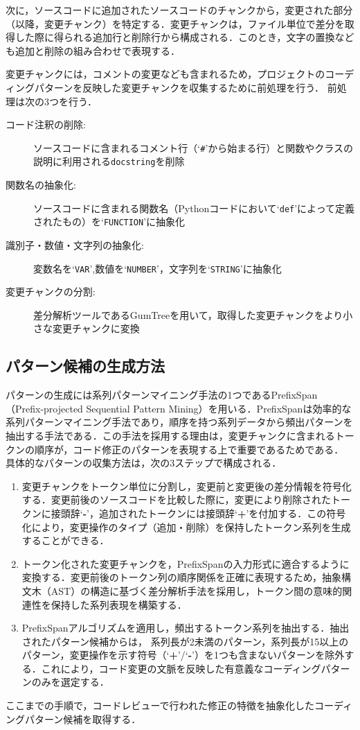 \documentclass[submit,techrep,noauthor]{ipsj}
\begin{document}
次に，ソースコードに追加されたソースコードのチャンクから，変更された部分（以降，変更チャンク）を特定する．変更チャンクは，ファイル単位で差分を取得した際に得られる追加行と削除行から構成される．このとき，文字の置換なども追加と削除の組み合わせで表現する．

変更チャンクには，コメントの変更なども含まれるため，プロジェクトのコーディングパターンを反映した変更チャンクを収集するために前処理を行う．
前処理は次の3つを行う．
\begin{description}
    \item[コード注釈の削除:]ソースコードに含まれるコメント行（`\texttt{\#}'から始まる行）と関数やクラスの説明に利用される\texttt{docstring}を削除
    \item[関数名の抽象化:]ソースコードに含まれる関数名（Pythonコードにおいて`\texttt{def}'によって定義されたもの）を`\texttt{FUNCTION}'に抽象化
    \item[識別子・数値・文字列の抽象化:]変数名を`\texttt{VAR}',数値を`\texttt{NUMBER}'，文字列を`\texttt{STRING}'に抽象化
    \item[変更チャンクの分割:]差分解析ツールであるGumTree\cite{gumtree}を用いて，取得した変更チャンクをより小さな変更チャンクに変換
\end{description}

\subsection{パターン候補の生成方法}
パターンの生成には系列パターンマイニング手法の1つであるPrefixSpan（Prefix-projected Sequential Pattern Mining）\cite{prefixspan}を用いる．PrefixSpanは効率的な系列パターンマイニング手法であり，順序を持つ系列データから頻出パターンを抽出する手法である．この手法を採用する理由は，変更チャンクに含まれるトークンの順序が，コード修正のパターンを表現する上で重要であるためである．
具体的なパターンの収集方法は，次の3ステップで構成される．
\begin{enumerate}
    \item 変更チャンクをトークン単位に分割し，変更前と変更後の差分情報を符号化する．変更前後のソースコードを比較した際に，変更により削除されたトークンに接頭辞`\textbf{-}'，追加されたトークンには接頭辞`\textbf{+}'を付加する．この符号化により，変更操作のタイプ（追加・削除）を保持したトークン系列を生成することができる．
    \item トークン化された変更チャンクを，PrefixSpanの入力形式に適合するように変換する．変更前後のトークン列の順序関係を正確に表現するため，抽象構文木（AST）の構造に基づく差分解析手法を採用し，トークン間の意味的関連性を保持した系列表現を構築する．
    \item PrefixSpanアルゴリズムを適用し，頻出するトークン系列を抽出する．抽出されたパターン候補からは， 系列長が2未満のパターン，系列長が15以上のパターン，変更操作を示す符号（`\textbf{+}'/`\textbf{-}'）を1つも含まないパターンを除外する．これにより，コード変更の文脈を反映した有意義なコーディングパターンのみを選定する．
\end{enumerate}
ここまでの手順で，コードレビューで行われた修正の特徴を抽象化したコーディングパターン候補を取得する．
\end{document}
